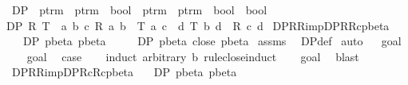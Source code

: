 \begin{isabellebody}
\isanewline
{}\isamarkupfalse%
\ DP\ {\isacharcolon}{\isacharcolon}\ {\isachardoublequoteopen}{\isacharparenleft}ptrm\ {\isasymRightarrow}\ ptrm\ {\isasymRightarrow}\ bool{\isacharparenright}\ {\isasymRightarrow}\ {\isacharparenleft}ptrm\ {\isasymRightarrow}\ ptrm\ {\isasymRightarrow}\ bool{\isacharparenright}\ {\isasymRightarrow}\ bool{\isachardoublequoteclose}\ \isanewline
{\isachardoublequoteopen}DP\ R\ T\ {\isacharequal}\ {\isacharparenleft}{\isasymforall}a\ b\ c{\isachardot}\ R\ a\ b\ {\isasymand}\ T\ a\ c\ {\isasymlongrightarrow}\ {\isacharparenleft}{\isasymexists}d{\isachardot}\ T\ b\ d\ {\isasymand}\ R\ c\ d{\isacharparenright}{\isacharparenright}{\isachardoublequoteclose}\isanewline
\isanewline
{}\isamarkupfalse%
\ DP{\isacharunderscore}R{\isacharunderscore}R{\isacharunderscore}imp{\isacharunderscore}DP{\isacharunderscore}R{\isacharunderscore}Rc{\isacharunderscore}pbeta{\isacharcolon}\isanewline
\ \ \ {\isachardoublequoteopen}DP\ pbeta\ pbeta{\isachardoublequoteclose}\isanewline
\ \ \ \ \ {\isachardoublequoteopen}DP\ pbeta\ {\isacharparenleft}close\ pbeta{\isacharparenright}{\isachardoublequoteclose}\isanewline
%
\isadelimproof
%
\endisadelimproof
%
\isatagproof
{}\isamarkupfalse%
\ assms\ \isamarkupfalse%
\ DP{\isacharunderscore}def\isanewline
{}\isamarkupfalse%
\ auto\isanewline
{}\isamarkupfalse%
\ {\isacharminus}\isanewline
{}\isamarkupfalse%
\ goal{}\ \isanewline
\ \ \isamarkupfalse%
\ goal{}{\isacharparenleft}{}{\isacharcomma}{}{\isacharparenright}\ \isamarkupfalse%
\ {\isacharquery}case\isanewline
\ \ \isamarkupfalse%
\ {\isacharparenleft}induct\ arbitrary{\isacharcolon}\ b\ rule{\isacharcolon}close{\isachardot}induct{\isacharparenright}\isanewline
\ \ \isamarkupfalse%
\ goal{}{\isacharparenleft}{}{\isacharparenright}\ \isamarkupfalse%
\ blast{\isacharplus}\isanewline
{}\isamarkupfalse%
%
\endisatagproof
{\isafoldproof}%
%
\isadelimproof
\isanewline
%
\endisadelimproof
\isanewline
{}\isamarkupfalse%
\ DP{\isacharunderscore}R{\isacharunderscore}R{\isacharunderscore}imp{\isacharunderscore}DP{\isacharunderscore}Rc{\isacharunderscore}Rc{\isacharunderscore}pbeta{\isacharcolon}\isanewline
\ \ \ {\isachardoublequoteopen}DP\ pbeta\ pbeta{\isachardoublequoteclose}\isanewline

\end{isabellebody}
